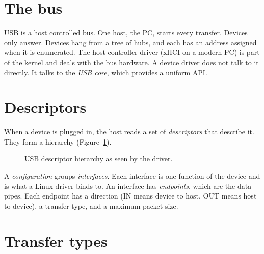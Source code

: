 \documentclass[11pt,a4paper,oneside]{report}
\begin{document}
\section{The bus}

USB is a host controlled bus. One host, the PC, starts every transfer. Devices only answer. Devices hang from a tree of hubs, and each has an address assigned when it is enumerated. The host controller driver (xHCI on a modern PC) is part of the kernel and deals with the bus hardware. A device driver does not talk to it directly. It talks to the \emph{USB core}, which provides a uniform API.

\section{Descriptors}

When a device is plugged in, the host reads a set of \emph{descriptors} that describe it. They form a hierarchy (Figure~\ref{fig:desc}).

\begin{figure}[ht]
\centering
{}
\caption{USB descriptor hierarchy as seen by the driver.}\label{fig:desc}
\end{figure}

A \emph{configuration} groups \emph{interfaces}. Each interface is one function of the device and is what a Linux driver binds to. An interface has \emph{endpoints}, which are the data pipes. Each endpoint has a direction (IN means device to host, OUT means host to device), a transfer type, and a maximum packet size.

\section{Transfer types}
\end{document}
